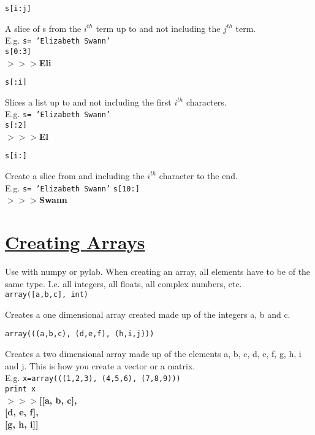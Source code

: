 \noindent \texttt{s[i:j]}
\begin{myindentpar}{1.4cm}
\vspace*{-1ex}
A slice of s from the $i^{th}$ term up to and not including the $j^{th}$ term.\\
E.g. \texttt{s= 'Elizabeth Swann'}\\
\texttt{s[0:3]}\\
\textbf{$>>>$Eli}
\end{myindentpar}


\noindent \texttt{s[:i]}
\begin{myindentpar}{1.4cm}
\vspace*{-1ex}
Slices a list up to and not including the first $i^{th}$ characters.\\
E.g. \texttt{s= 'Elizabeth Swann'}\\
\texttt{s[:2]}\\
\textbf{$>>>$El}
\end{myindentpar}

\noindent \texttt{s[i:]}
\begin{myindentpar}{1.4cm}
\vspace*{-1ex}
Create a slice from and including the $i^{th}$ character to the end.\\
E.g. \texttt{s= 'Elizabeth Swann'}
\texttt{s[10:]}\\
\textbf{$>>>$Swann}
\end{myindentpar}

\hypertarget{arrays}{\section*{\underline{Creating Arrays}}}

Use with numpy or pylab. When creating an array, all elements have to be of the same type. I.e. all integers, all floats, all complex numbers, etc.\\[2ex]
\noindent \texttt{array([a,b,c], int)}
\begin{myindentpar}{1.4cm}
\vspace*{-1ex}
Creates a one dimensional array created made up of the integers a, b and c.
\end{myindentpar}

\noindent \texttt{array(((a,b,c), (d,e,f), (h,i,j)))}
\begin{myindentpar}{1.4cm}
\vspace*{-1ex}
Creates a two dimensional array made up of the elements a, b, c, d, e, f, g, h, i and j. This is how you create a vector or a matrix.\\
E.g. \texttt{x=array(((1,2,3), (4,5,6), (7,8,9)))}\\
\texttt{{\color{purple}print} x}\\
\textbf{$>>>$[[a, b, c],}\\
\-\hspace*{0.905cm} \textbf{[d, e, f],}\\
\-\hspace*{0.76cm} \textbf{   [g, h, i]]}
\end{myindentpar}


